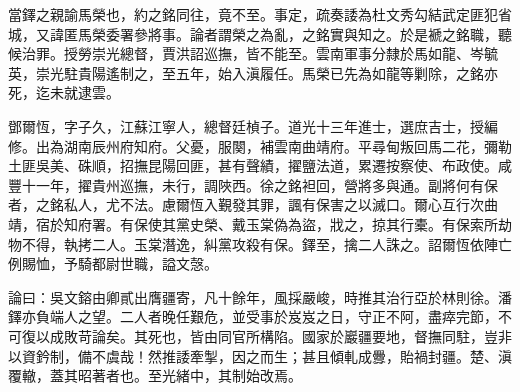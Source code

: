 \begin{pinyinscope}
當鐸之親諭馬榮也，約之銘同往，竟不至。事定，疏奏諉為杜文秀勾結武定匪犯省城，又諱匿馬榮委署參將事。論者謂榮之為亂，之銘實與知之。於是褫之銘職，聽候治罪。授勞崇光總督，賈洪詔巡撫，皆不能至。雲南軍事分隸於馬如龍、岑毓英，崇光駐貴陽遙制之，至五年，始入滇履任。馬榮已先為如龍等剿除，之銘亦死，迄未就逮雲。

鄧爾恆，字子久，江蘇江寧人，總督廷楨子。道光十三年進士，選庶吉士，授編修。出為湖南辰州府知府。父憂，服闋，補雲南曲靖府。平尋甸叛回馬二花，彌勒土匪吳美、硃順，招撫昆陽回匪，甚有聲績，擢鹽法道，累遷按察使、布政使。咸豐十一年，擢貴州巡撫，未行，調陜西。徐之銘袒回，營將多與通。副將何有保者，之銘私人，尤不法。慮爾恆入覲發其罪，諷有保害之以滅口。爾心互行次曲靖，宿於知府署。有保使其黨史榮、戴玉棠偽為盜，戕之，掠其行橐。有保索所劫物不得，執拷二人。玉棠潛逸，糾黨攻殺有保。鐸至，擒二人誅之。詔爾恆依陣亡例賜恤，予騎都尉世職，謚文愨。

論曰：吳文鎔由卿貳出膺疆寄，凡十餘年，風採嚴峻，時推其治行亞於林則徐。潘鐸亦負端人之望。二人者晚任艱危，並受事於岌岌之日，守正不阿，盡瘁完節，不可復以成敗苛論矣。其死也，皆由同官所構陷。國家於巖疆要地，督撫同駐，豈非以資鈐制，備不虞哉！然推諉牽掣，因之而生；甚且傾軋成釁，貽禍封疆。楚、滇覆轍，蓋其昭著者也。至光緒中，其制始改焉。


\end{pinyinscope}